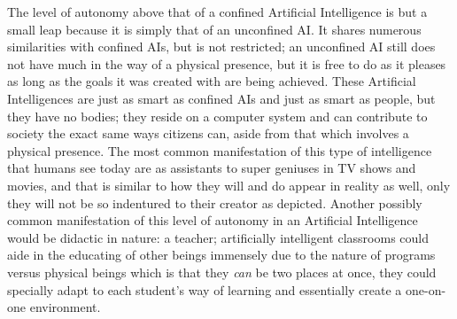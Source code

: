 The level of autonomy above that of a confined Artificial Intelligence is but a small leap because it is simply that of an unconfined AI. It shares numerous similarities with confined AIs, but is not restricted; an unconfined AI still does not have much in the way of a physical presence, but it is free to do as it pleases as long as the goals it was created with are being achieved. These Artificial Intelligences are just as smart as confined AIs and just as smart as people, but they have no bodies; they reside on a computer system and can contribute to society the exact same ways citizens can, aside from that which involves a physical presence. The most common manifestation of this type of intelligence that humans see today are as assistants to super geniuses in TV shows and movies, and that is similar to how they will and do appear in reality as well, only they will not be so indentured to their creator as depicted. Another possibly common manifestation of this level of autonomy in an Artificial Intelligence would be didactic in nature: a teacher; artificially intelligent classrooms could aide in the educating of other beings immensely due to the nature of programs versus physical beings which is that they \textit{can} be two places at once, they could specially adapt to each student's way of learning and essentially create a one-on-one environment.
